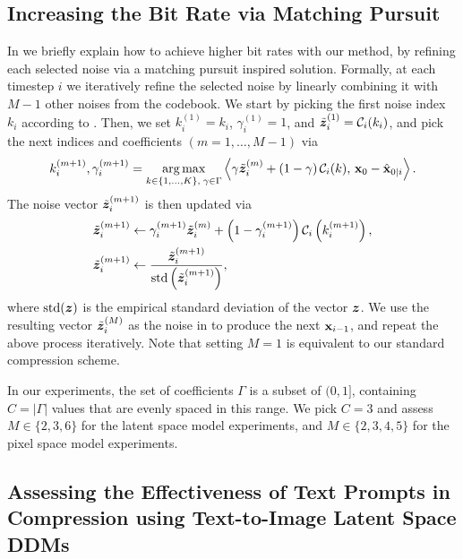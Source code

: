 \subsection{Increasing the Bit Rate via Matching Pursuit}\label{app:matching_pursuit}
In  we briefly explain how to achieve higher bit rates with our method, by refining each selected noise via a matching pursuit inspired solution.
Formally, at each timestep $i$ we iteratively refine the selected noise by linearly combining it with $M-1$ other noises from the codebook.
We start by picking the first noise index $k_{i}$ according to .
Then, we set $k_{i}^{(1)}=k_{i}$, $\gamma_{i}^{(1)}=1$, and $\tilde{{\bm{z}}}_{i}^{(1)}={\mathcal{C}}_{i}(k_{i})$, and pick the next indices and coefficients $(m=1,\hdots,M-1)$ via
\begin{align}
    k_i^{(m+1)}, \gamma_i^{(m+1)} = \operatorname*{arg\,max}_{k\in\{1,\hdots,K\},\;\gamma \in \Gamma} \left\langle \gamma\tilde{{\bm{z}}}_{i}^{(m)}+\left(1-\gamma\right){\mathcal{C}}_{i}(k) ,\,{\mathbf{x}}_0-\hat{{\mathbf{x}}}_{0|i}\right\rangle.
\end{align}
The noise vector $\tilde{{\bm{z}}}_{i}^{(m+1)}$ is then updated via
\begin{align}
&\tilde{{\bm{z}}}_{i}^{(m+1)}\leftarrow\gamma_{i}^{(m+1)}\tilde{{\bm{z}}}_{i}^{(m)}+\left(1-\gamma_{i}^{(m+1)}\right){\mathcal{C}}_{i}\left(k_{i}^{(m+1)}\right),\\
&\tilde{{\bm{z}}}_{i}^{(m+1)}\leftarrow \frac{\tilde{{\bm{z}}}_{i}^{(m+1)}}{\text{std}\left(\tilde{{\bm{z}}}_{i}^{(m+1)}\right)},
\end{align}
where $\text{std}({\bm{z}})$ is the empirical standard deviation of the vector ${\bm{z}}$.
We use the resulting vector $\tilde{{\bm{z}}}_{i}^{(M)}$ as the noise in  to produce the next ${\mathbf{x}}_{i-1}$, and repeat the above process iteratively.
Note that setting $M=1$ is equivalent to our standard compression scheme.


In our experiments, the set of coefficients $\Gamma$ is a subset of $(0,1]$, containing $C=|\Gamma|$ values that are evenly spaced in this range.
We pick $C=3$ and assess $M\in\{2,3,6\}$ for the latent space model experiments, and $M\in\{2,3,4,5\}$ for the pixel space model experiments.




\subsection{Assessing the Effectiveness of Text Prompts in Compression using Text-to-Image Latent Space DDMs}\label{app:text_effect}

